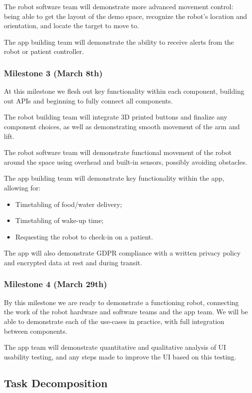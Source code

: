 \documentclass{article}
\begin{document}
The robot software team will demonstrate more advanced movement control: being able to get the layout of the demo space, recognize the robot's location and orientation, and locate the target to move to. 

The app building team will demonstrate the ability to receive alerts from the robot or patient controller. 

\subsubsection{Milestone 3 (March 8th)}
At this milestone we flesh out key functionality within each component, building out APIs and beginning to fully connect all components. 

The robot building team will integrate 3D printed buttons and finalize any component choices, as well as demonstrating smooth movement of the arm and lift. 

The robot software team will demonstrate functional movement of the robot around the space using overhead and built-in sensors, possibly avoiding obstacles. 

The app building team will demonstrate key functionality within the app, allowing for:
\begin{itemize}
\item Timetabling of food/water delivery;
\item Timetabling of wake-up time;
\item Requesting the robot to check-in on a patient.
\end{itemize}
The app will also demonstrate GDPR compliance with a written privacy policy and encrypted data at rest and during transit.

\subsubsection{Milestone 4 (March 29th)}
By this milestone we are ready to demonstrate a functioning robot, connecting the work of the robot hardware and software teams and the app team. We will be able to demonstrate each of the use-cases in practice, with full integration between components.

The app team will demonstrate quantitative and qualitative analysis of UI usability testing, and any steps made to improve the UI based on this testing.

\subsection{Task Decomposition}
\end{document}
